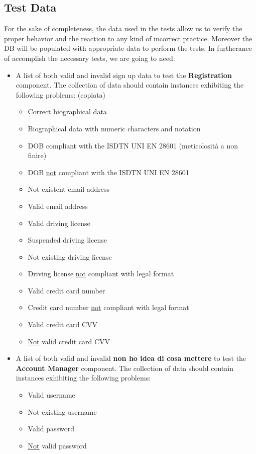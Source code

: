 \documentclass[english]{article}
\begin{document}
\subsection{Test Data}

For the sake of completeness, the data used in the tests allow us to verify the proper behavior and the reaction to any kind of incorrect practice. Moreover the DB will be populated with appropriate data to perform the tests.
In furtherance of accomplish the necessary tests, we are going to need:

\begin{itemize}
  \item{A list of both valid and invalid sign up data to test the \textbf{Registration} component.
  The collection of data should contain instances exhibiting the following problems: (copiata)
    \begin{itemize}
      \item{Correct biographical data}
      \item{Biographical data with numeric characters and notation}
      \item{DOB compliant with the ISDTN UNI EN 28601} (meticolosità a non finire)
      \item{DOB \underline{not} compliant with the ISDTN UNI EN 28601}
      \item{Not existent email address}
      \item{Valid email address}
      \item{Valid driving license}
      \item{Suspended driving license}
      \item{Not existing driving license}
      \item{Driving license \underline{not} compliant with legal format}
      \item{Valid credit card number}
      \item{Credit card number \underline{not} compliant with legal format}
      \item{Valid credit card CVV}
      \item{\underline{Not} valid credit card CVV}
    \end{itemize}}

    \item{A list of both valid and invalid \textbf{non ho idea di cosa mettere} to test the \textbf{Account Manager} component.
    The collection of data should contain instances exhibiting the following problems:
    \begin{itemize}
      \item{Valid username}
      \item{Not existing username}
      \item{Valid password}
      \item{\underline{Not} valid password}
    \end{itemize}}


\end{itemize}
\end{document}
